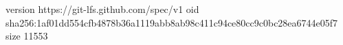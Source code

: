 version https://git-lfs.github.com/spec/v1
oid sha256:1af01dd554cfb4878b36a1119abb8ab98c411c94ce80cc9c0bc28ea6744e05f7
size 11553
